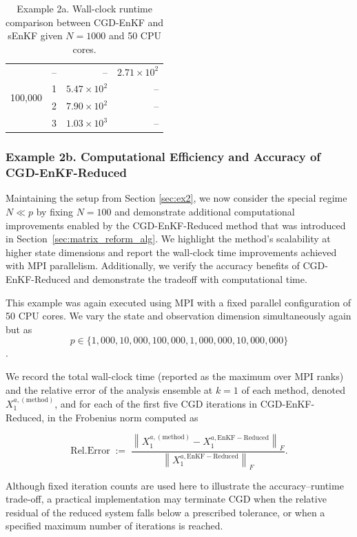 \documentclass[11p]{elsarticle}
\numberwithin{equation}{section}
\begin{document}
\begin{table}[ht]
\begin{tabular}{r r r r}
  \multirow{4}{*}{100{,}000}
    & -- & --                      & $2.71\times10^{2}$ \\
    & 1  & $5.47\times10^{2}$      & -- \\
    & 2  & $7.90\times10^{2}$      & -- \\
    & 3  & $1.03\times10^{3}$      & -- \\
  \bottomrule
  \end{tabular}
  \caption{Example 2a. Wall-clock runtime comparison between CGD-EnKF and sEnKF given $N=1000$ and 50 CPU cores.}
  \label{tab:cg_full_vs_serial_N1000}
  \end{table}



\subsubsection{Example 2b. Computational Efficiency and Accuracy of CGD-EnKF-Reduced}
Maintaining the setup from Section \ref{sec:ex2}, we now consider the special regime $N \ll p$ by fixing $N=100$ and demonstrate additional computational improvements enabled by the CGD-EnKF-Reduced method that was introduced in Section~\ref{sec:matrix_reform_alg}.
We highlight the method's scalability at higher state dimensions and report the wall-clock time improvements achieved with MPI parallelism.  Additionally, we verify the accuracy benefits of CGD-EnKF-Reduced and demonstrate the tradeoff with computational time.



This example was again executed using MPI with a fixed parallel configuration of
50 CPU cores. We vary the state and observation dimension simultaneously again but as
$$p\in \{ 1{,}000, 10{,}000, 100{,}000, 1{,}000{,}000,10{,}000{,}000 \} $$.

We record the total wall-clock time (reported as the maximum over
MPI ranks) and the relative error of the analysis ensemble at $k=1$ of each method, denoted $X_1^{a,\mathrm{(method)}}$, and for each of the first five CGD iterations in CGD-EnKF-Reduced, in the Frobenius norm computed as


\begin{equation}
\label{eq:rel_frob}
\mathrm{Rel. Error}
\;:=\;
\frac{\left\| X_1^{a,\mathrm{(method)}} - X_1^{a,\mathrm{EnKF-Reduced}} \right\|_F}
     {\left\| X_1^{a,\mathrm{EnKF-Reduced}} \right\|_F}.
\end{equation} 


{
Although fixed iteration counts are used here to illustrate the
accuracy--runtime trade-off, a practical implementation may terminate
CGD when the relative residual of the reduced system falls below a prescribed tolerance, or when a specified maximum
number of iterations is reached.
}
\end{document}
